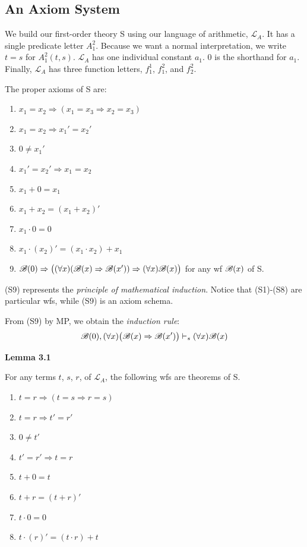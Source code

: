 \subsection{An Axiom System}

We build our first-order theory S using our language of arithmetic, $\mathscr{L}_A$. It has a single predicate letter $A_1^2$. Because we want a normal interpretation, we write $t=s$ for $A_1^2(t, s)$. $\mathscr{L}_A$ has one individual constant $a_1$. $0$ is the shorthand for $a_1$. Finally, $\mathscr{L}_A$ has three function letters, $f_1^1$, $f_1^2$, and $f_2^2$.

The proper axioms of S are:

\begin{enumerate} [label=(S\arabic*), leftmargin=2cm]
    \item $x_1=x_2 \Rightarrow (x_1=x_3 \Rightarrow x_2=x_3)$
    \item $x_1=x_2\Rightarrow x_1'=x_2'$
    \item $0 \not= x_1'$
    \item $x_1'=x_2' \Rightarrow x_1=x_2$
    \item $x_1+0=x_1$
    \item $x_1+x_2=(x_1+x_2)'$
    \item $x_1\cdot 0=0$
    \item $x_1 \cdot (x_2)' = (x_1 \cdot x_2) + x_1$
    \item $\mathscr{B}(0) \Rightarrow \big( (\forall x)(\mathscr{B}(x) \Rightarrow \mathscr{B}(x')) \Rightarrow (\forall x) \mathscr{B}(x)\big)$ for any wf $\mathscr{B}(x)$ of S.
\end{enumerate}

(S9) represents the \textit{principle of mathematical induction}. Notice that (S1)-(S8) are particular wfs, while (S9) is an axiom schema.

From (S9) by MP, we obtain the \textit{induction rule}:
\[\mathscr{B}(0), (\forall x) \big( \mathscr{B}(x) \Rightarrow \mathscr{B}(x') \big) \vdash_s (\forall x) \mathscr{B}(x)\]

\textbf{Lemma 3.1}

For any terms $t$, $s$, $r$, of $\mathscr{L}_A$, the following wfs are theorems of S.

\begin{enumerate} [label=(S\arabic*)', leftmargin=2cm]
    \item $t=r \Rightarrow (t=s \Rightarrow r=s)$
    \item $t=r\Rightarrow t'=r'$
    \item $0 \not= t'$
    \item $t'=r' \Rightarrow t=r$
    \item $t+0=t$
    \item $t+r=(t+r)'$
    \item $t\cdot 0=0$
    \item $t \cdot (r)' = (t \cdot r) + t$
\end{enumerate}

